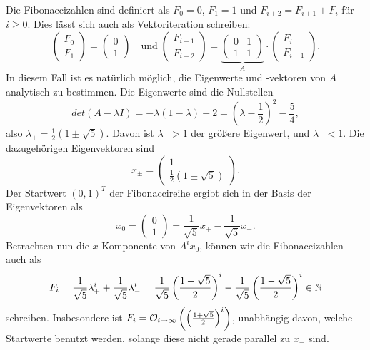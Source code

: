 Die Fibonaccizahlen sind definiert als $F_0 = 0$, $F_1=1$ und
$F_{i+2} = F_{i+1} + F_i$ für $i \ge 0$. Dies lässt sich auch als
Vektoriteration schreiben:
\begin{equation}
  \begin{pmatrix}
    F_0\\
    F_1
  \end{pmatrix}=
  \begin{pmatrix}
    0\\
    1
  \end{pmatrix}
  \quad\text{und}\;
  \begin{pmatrix}
    F_{i+1}\\
    F_{i+2}
  \end{pmatrix}=
  \underbrace{\begin{pmatrix}
      0 & 1\\
      1 & 1
    \end{pmatrix}}_A\cdot
  \begin{pmatrix}
    F_i\\
    F_{i+1}
  \end{pmatrix}.
\end{equation}
In diesem Fall ist es natürlich möglich, die Eigenwerte und -vektoren
von $A$ analytisch zu bestimmen. Die Eigenwerte sind die Nullstellen
\begin{equation}
  det(A-\lambda I) = -\lambda(1-\lambda) - 2 = \left(\lambda
    -\frac{1}{2}\right)^2 - \frac{5}{4},
\end{equation}
also $\lambda_{\pm} = \frac{1}{2} \left(1 \pm \sqrt{5}\right)$. Davon
ist $\lambda_+ > 1$ der größere Eigenwert, und $\lambda_-<1$. Die
dazugehörigen Eigenvektoren sind
\begin{equation}
  x_{\pm} =
  \begin{pmatrix}
    1\\
    \frac{1}{2} \left(1 \pm
      \sqrt{5}\right)
  \end{pmatrix}.
\end{equation}
Der Startwert $(0,1)^T$ der Fibonaccireihe ergibt sich in der Basis
der Eigenvektoren als
\begin{equation}
  x_0 = 
  \begin{pmatrix}
    0\\
    1
  \end{pmatrix} =
  \frac{1}{\sqrt{5}} x_+ - \frac{1}{\sqrt{5}} x_-.
\end{equation}
Betrachten nun die $x$-Komponente von $A^ix_0$, können wir die
Fibonaccizahlen auch als
\begin{equation}
  F_i = \frac{1}{\sqrt{5}}\lambda_+^i + \frac{1}{\sqrt{5}}\lambda_-^i
  = \frac{1}{\sqrt{5}} \left(\frac{1 + \sqrt{5}}{2}\right)^i
  - \frac{1}{\sqrt{5}} \left(\frac{1 - \sqrt{5}}{2}\right)^i \in\mathbb{N}
\end{equation}
schreiben. Insbesondere ist $F_i = \mathcal O_{i\to\infty}\left(\left(\frac{1
      + \sqrt{5}}{2}\right)^i\right)$, unabhängig davon, welche
Startwerte benutzt werden, solange diese nicht gerade parallel zu
$x_-$ sind.

